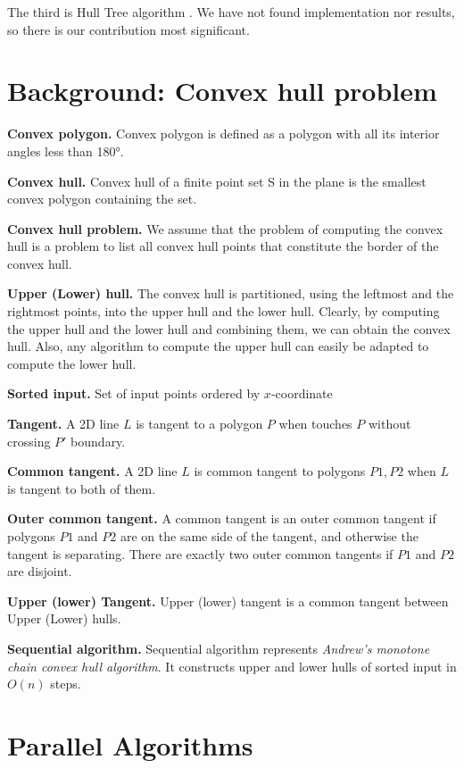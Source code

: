 \documentclass[letterpaper]{article}
\newcommand{\mypar}[1]{{\bf #1.}}
\theoremstyle{definition}
\begin{document}
The third is Hull Tree algorithm \cite{HullTree}. We have not found implementation nor results, so there is our contribution most significant.
  
\section{Background: Convex hull problem}\label{sec:background}

\mypar{Convex polygon} Convex polygon is defined as a polygon with all its interior angles less than 180°.

\mypar{Convex hull}
Convex hull of a finite point set S in the plane is the smallest convex polygon containing the set.

\mypar{Convex hull problem}
We assume that the problem of computing the convex hull is a problem to list all convex hull points that constitute the border of the convex hull. 

\mypar{Upper (Lower) hull}
The convex hull is partitioned, using the leftmost and the rightmost points, into the upper
hull and the lower hull. Clearly, by computing the upper hull and the lower hull and combining them, we can obtain the convex hull. Also, any algorithm to compute the upper hull can easily be adapted to compute the lower hull.

\mypar{Sorted input} 
Set of input points ordered by $x$-coordinate

\mypar{Tangent} 
 A 2D line $L$ is tangent to a polygon $P$ when touches $P$ without crossing $P'$ boundary.

\mypar{Common tangent} 
A 2D line $L$ is common tangent to polygons $P1, P2$ when $L$ is tangent to both of them. 

\mypar{Outer common tangent}
A common tangent is an outer common tangent if polygons $P1$ and $P2$ are on the same side of the tangent, and otherwise the tangent is separating.
There are exactly two outer common tangents if $P1$ and $P2$ are disjoint. \cite{DBLP:journals/corr/Abrahamsen15}  

\mypar{Upper (lower) Tangent}
Upper (lower) tangent is a common tangent between Upper (Lower) hulls. 

\mypar{Sequential algorithm}
Sequential algorithm represents \textit{Andrew's monotone chain convex hull algorithm}. It constructs upper and lower hulls of sorted input in $O(n)$ steps. \cite{DBLP:journals/ipl/Andrew79} 

\section{Parallel Algorithms}\label{sec:yourmethod}
\end{document}
